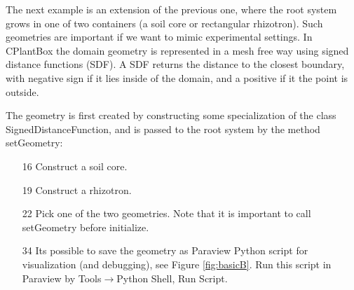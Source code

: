 \documentclass[a4paper]{article}
\begin{document}
The next example is an extension of the previous one, where the root system grows in one of two containers (a soil core or rectangular rhizotron). Such geometries are important if we want to mimic experimental settings. In CPlantBox the domain geometry is represented in a mesh free way using signed distance functions (SDF). A SDF returns the distance to the closest boundary, with negative sign if it lies inside of the domain, and a positive if it the point is outside.



The geometry is first created by constructing some specialization of the class SignedDistanceFunction, and is passed to the root system by the method setGeometry: 
\begin{itemize}
 \item[16] Construct a soil core. 
 \item[19] Construct a rhizotron.
 \item[22] Pick one of the two geometries. Note that it is important to call setGeometry before initialize.
 \item[34] Its possible to save the geometry as Paraview Python script for visualization (and debugging), see Figure \ref{fig:basicB}. Run this script in Paraview by Tools$\rightarrow$Python Shell, Run Script.
\end{itemize}
\end{document}
